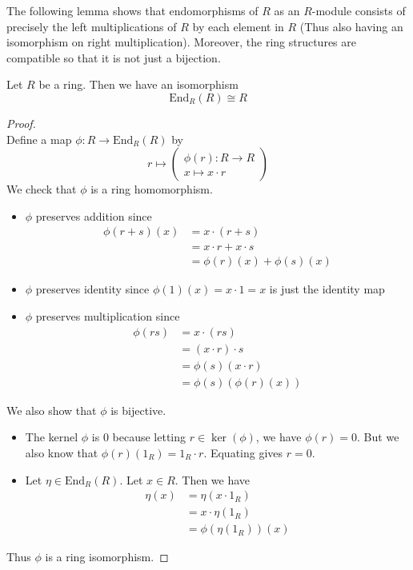 \documentclass[a4paper]{article}
\begin{document}
The following lemma shows that endomorphisms of $R$ as an $R$-module consists of precisely the left multiplications of $R$ by each element in $R$ (Thus also having an isomorphism on right multiplication). Moreover, the ring structures are compatible so that it is not just a bijection. 

\begin{prp}{}{} Let $R$ be a ring. Then we have an isomorphism $$\text{End}_R(R)\cong R$$ \tcbline
\begin{proof}~\\
Define a map $\phi:R\to\text{End}_R(R)$ by $$r\mapsto\begin{pmatrix}
\phi(r):R\to R\\x\mapsto x\cdot r
\end{pmatrix}$$ We check that $\phi$ is a ring homomorphism. 
\begin{itemize}
\item $\phi$ preserves addition since 
\begin{align*}
\phi(r+s)(x)&=x\cdot (r+s)\\
&=x\cdot r+x\cdot s\\
&=\phi(r)(x)+\phi(s)(x)
\end{align*}
\item $\phi$ preserves identity since $\phi(1)(x)=x\cdot 1=x$ is just the identity map
\item $\phi$ preserves multiplication since 
\begin{align*}
\phi(rs)&=x\cdot (rs)\\
&=(x\cdot r)\cdot s\\
&=\phi(s)(x\cdot r)\\
&=\phi(s)(\phi(r)(x))
\end{align*}
\end{itemize}
We also show that $\phi$ is bijective. 
\begin{itemize}
\item The kernel $\phi$ is $0$ because letting $r\in\ker(\phi)$, we have $\phi(r)=0$. But we also know that $\phi(r)(1_R)=1_R\cdot r$. Equating gives $r=0$. 
\item Let $\eta\in\text{End}_R(R)$. Let $x\in R$. Then we have 
\begin{align*}
\eta(x)&=\eta(x\cdot 1_R)\\
&=x\cdot\eta(1_R)\tag{$\eta$ is a module homomorphism}\\
&=\phi(\eta(1_R))(x)
\end{align*}
\end{itemize}
Thus $\phi$ is a ring isomorphism. 
\end{proof}
\end{prp}
\end{document}
